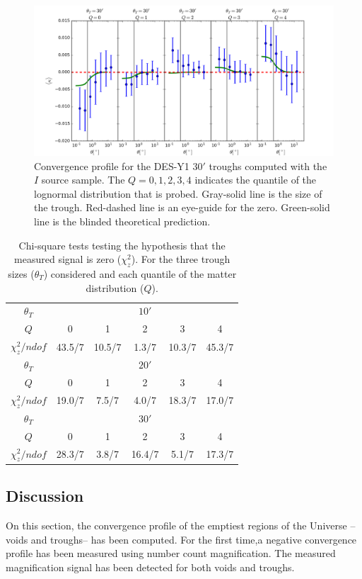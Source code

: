 \begin{figure}
\includegraphics[width=\textwidth]{./figures_y1/troughs_ap30_mag_auto_i1.png}
\caption{Convergence profile for the DES-Y1 $30'$ troughs computed with the $I$ source sample. The $Q=0,1,2,3,4$ indicates the quantile of the lognormal distribution that is probed. Gray-solid line is the size of the trough. Red-dashed line is an eye-guide for the zero. Green-solid line is the blinded theoretical prediction.}
\label{fig:troughs_ap30}
\end{figure}

\begin{table}
\begin{center}
\begin{tabular}{c | c c c c c }
$\theta_T$& & &$10'$& &\\
$Q$&0&1&2&3&4\\
$\chi^2_z/ndof$ &43.5/7&10.5/7&1.3/7&10.3/7&45.3/7\\
\hline
\hline
$\theta_T$& & &$20'$& & \\
$Q$&0&1&2&3&4 \\
$\chi^2_z/ndof$&19.0/7&7.5/7&4.0/7&18.3/7&17.0/7\\
\hline
\hline
$\theta_T$& & &$30'$& & \\
$Q$&0&1&2&3&4\\
$\chi^2_z/ndof$&28.3/7&3.8/7&16.4/7&5.1/7&17.3/7\\
\end{tabular}
\end{center}
\caption{Chi-square tests testing the hypothesis that the measured signal is zero ($\chi_z^2$). For the three trough sizes ($\theta_T$) considered and each quantile of the matter distribution ($Q$). }
\label{tab:chisq_trough}
\end{table}
\subsection{Discussion}
\label{sec:discussion_y1}
On this section, the convergence profile of the emptiest regions of the Universe --voids and troughs-- has been computed. For the first time,a negative convergence profile has been measured using number count magnification. The measured magnification signal has been detected for both voids and troughs.
\newline

